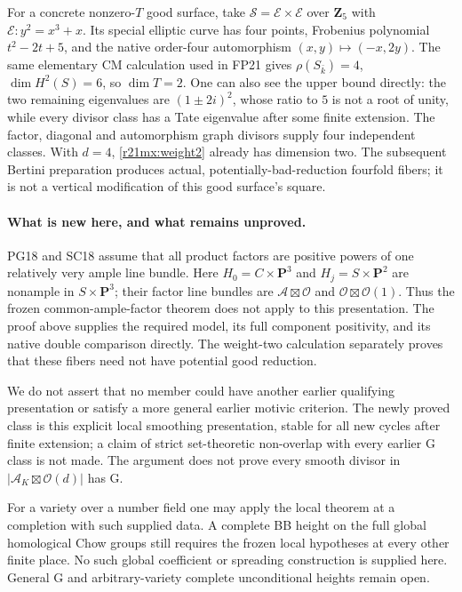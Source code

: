 For a concrete nonzero-$T$ good surface, take
$\mathcal S=\mathcal E\times\mathcal E$ over $\mathbf Z_5$ with
$\mathcal E:y^2=x^3+x$.  Its special elliptic curve has four points,
Frobenius polynomial $t^2-2t+5$, and the native order-four
automorphism $(x,y)\mapsto(-x,2y)$.  The same elementary CM calculation
used in FP21 gives $\rho(S_{\bar k})=4$, $\dim H^2(S)=6$, so
$\dim T=2$.  One can also see the upper bound directly: the two
remaining eigenvalues are $(1\pm2i)^2$, whose ratio to $5$ is not
a root of unity, while every divisor class has a Tate eigenvalue
after some finite extension.  The factor, diagonal and automorphism
graph divisors supply four independent classes.  With $d=4$,
\eqref{r21mx:weight2} already has dimension two.  The subsequent
Bertini preparation produces actual, potentially-bad-reduction
fourfold fibers; it is not a vertical modification of this good
surface's square.

\paragraph{What is new here, and what remains unproved.}
PG18 and SC18 assume that all product factors are positive powers of
one relatively very ample line bundle.  Here $H_0=C\times\mathbf P^3$
and $H_j=S\times\mathbf P^2$ are nonample in $S\times\mathbf P^3$;
their factor line bundles are $\mathcal A\boxtimes\mathcal O$ and
$\mathcal O\boxtimes\mathcal O(1)$.  Thus the frozen common-ample-factor
theorem does not apply to this presentation.  The proof above supplies
the required model, its full component positivity, and its native
double comparison directly.  The weight-two calculation separately
proves that these fibers need not have potential good reduction.

We do not assert that no member could have another earlier qualifying
presentation or satisfy a more general earlier motivic criterion.
The newly proved class is this explicit local smoothing presentation,
stable for all new cycles after finite extension; a claim of strict
set-theoretic non-overlap with every earlier G class is not made.
The argument does not prove every smooth divisor in
$|\mathcal A_K\boxtimes\mathcal O(d)|$ has G.

For a variety over a number field one may apply the local theorem
at a completion with such supplied data.  A complete BB height on
the full global homological Chow groups still requires the frozen
local hypotheses at every other finite place.  No such global
coefficient or spreading construction is supplied here.  General G
and arbitrary-variety complete unconditional heights remain open.
